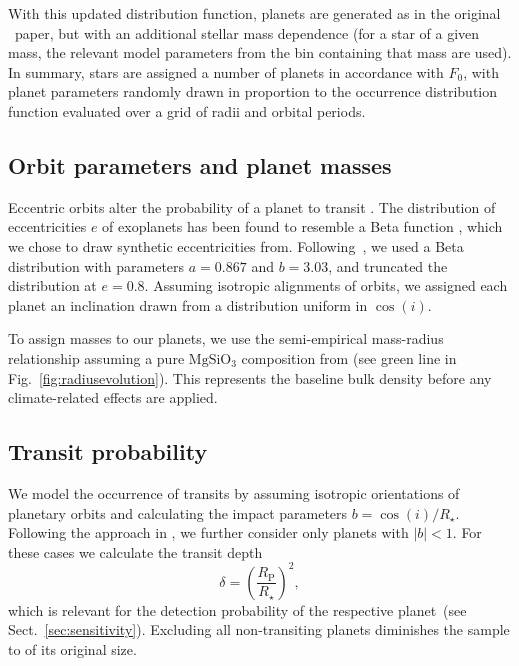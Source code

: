 \documentclass[twocolumn,twocolappendix]{aastex631}
\begin{document}
With this updated distribution function, planets are generated as in the original \bioverse\ paper, but with an additional stellar mass dependence (for a star of a given mass, the relevant model parameters from the bin containing that mass are used). In summary, stars are assigned a number of planets in accordance with $F_0$, with planet parameters randomly drawn in proportion to the occurrence distribution function evaluated over a grid of radii and orbital periods.

\subsection{Orbit parameters and planet masses}\label{sec:met-orbits_masses}
Eccentric orbits alter the probability of a planet to transit \citep[e.g.,][]{Barnes2007a}.
The distribution of eccentricities $e$ of exoplanets has been found to resemble a Beta function \citep{Kipping2013b}, which we chose to draw synthetic eccentricities from.
Following~\citet{Kipping2013b}, we used a Beta distribution with parameters $a=0.867$ and $b=3.03$, and truncated the distribution at $e = 0.8$.
Assuming isotropic alignments of orbits, we assigned each planet an inclination drawn from a distribution uniform in $\cos(i)$.

To assign masses to our planets, we use the semi-empirical mass-radius relationship assuming a pure $\mathrm{MgSiO_3}$ composition from \citet{Zeng2016} (see green line in Fig.~\ref{fig:radiusevolution}).
This represents the baseline bulk density before any climate-related effects are applied.


\subsection{Transit probability}
We model the occurrence of transits by assuming isotropic orientations of planetary orbits and calculating the impact parameters $b = \cos(i)/R_\star$.
Following the approach in \citet{Bixel2021}, we further consider only planets with $|b| < 1$.
For these cases we calculate the transit depth
\begin{equation}\label{eq:transitdepth}
    \delta = \left( \frac{R_\mathrm{P}}{R_\star} \right)^2,
\end{equation}
which is relevant for the detection probability of the respective planet~(see Sect.~\ref{sec:sensitivity}).
Excluding all non-transiting planets diminishes the sample to  of its original size.
\end{document}
